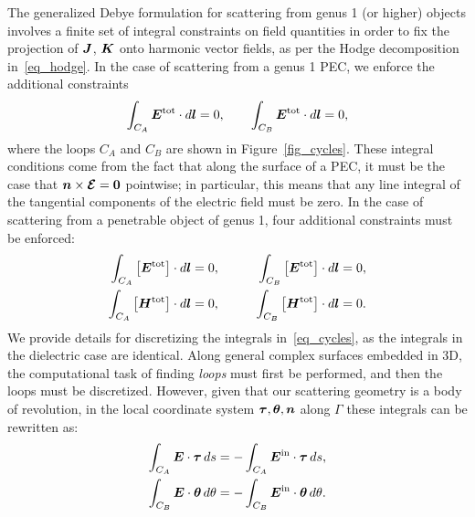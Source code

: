 \documentclass[11pt]{article}
\newcommand{\vct}{\vectorsym}
\newcommand{\bn}{\vct{ n}}
\newcommand{\bE}{\vectorsym{E}}
\newcommand{\bcE}{\bm{{\mathcal E}}}
\newcommand{\bJ}{\vct{ J}}
\newcommand{\bK}{\vct{ K}}
\newcommand\tauhat{\vct{{ \tau}}}
\newcommand\thetahat{{\vct{{\theta}}}}
\newcommand\nhat{\vct{ {n}}}
\newcommand\bl{\vct{ l}}
\newcommand\bEtot{\vct{E}^\textnormal{tot}}
\newcommand\bHtot{\vct{H}^\textnormal{tot}}
\newcommand\bEin{\vct{E}^\textnormal{in}}
\numberwithin{equation}{section}
\begin{document}
The generalized Debye formulation for scattering from genus 1 (or
higher) objects involves a finite set of
integral constraints on field quantities in order to fix the
projection of $\bJ$, $\bK$ onto harmonic vector fields, as per the
Hodge decomposition in~\eqref{eq_hodge}. In the case of scattering
from a genus 1 PEC, we enforce the additional constraints 
\begin{equation}\label{eq_cycles}
\int_{C_A} \bEtot \cdot d\bl  = 0, \qquad 
\int_{C_B} \bEtot \cdot d\bl = 0,
\end{equation}
where the loops $C_A$ and $C_B$ are shown in Figure~\ref{fig_cycles}.
These integral conditions come from the fact that along the surface of
a PEC, it must be the case that $\bn \times \bcE = \vct{0}$ pointwise; in
particular, this means that any line integral of the tangential
components of the electric field must be zero.
In the case of scattering from a penetrable object of genus 1, four
additional constraints must be enforced:
\begin{equation}
  \begin{aligned}
    \int_{C_A} \left[ \bEtot \right] \cdot d\bl  &= 0, &\qquad 
    \int_{C_B} \left[ \bEtot \right] \cdot d\bl  &= 0, \\
    \int_{C_A} \left[ \bHtot \right] \cdot d\bl  &= 0, &\qquad 
    \int_{C_B} \left[ \bHtot \right] \cdot d\bl  &= 0.
  \end{aligned}
\end{equation}
We provide details for discretizing the integrals
in~\eqref{eq_cycles}, as the integrals in the dielectric case are
identical.  Along general complex surfaces embedded in 3D, the
computational task of finding \emph{loops} must first be performed,
and then the loops must be discretized. However, given that our
scattering geometry is a body of revolution, in the local coordinate
system $\tauhat, \thetahat, \nhat$ along $\Gamma$ these integrals can
be rewritten as:
\begin{equation}\label{eq_cycles2}
  \begin{aligned}
    \int_{C_A} \bE \cdot \tauhat \, ds &= - \int_{C_A} \bEin \cdot
    \tauhat \, ds, \\
    \int_{C_B} \bE \cdot \thetahat \, d\theta &= - \int_{C_B} \bEin \cdot
    \thetahat \, d\theta.
  \end{aligned}
\end{equation}
\end{document}
